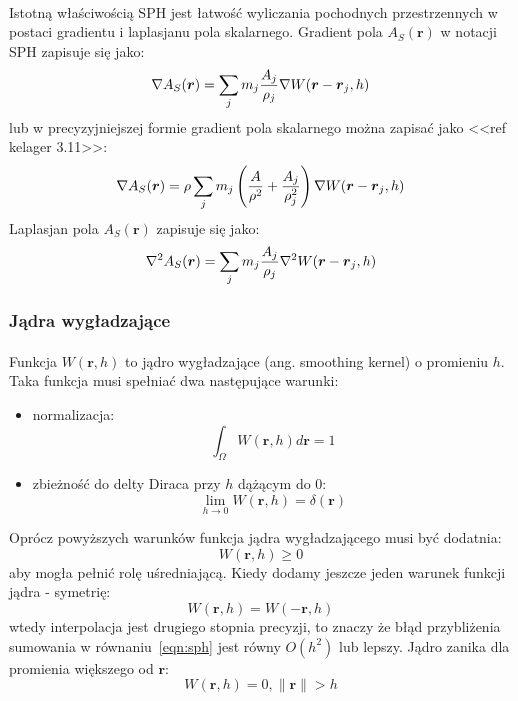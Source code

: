 \paragraph{}
Istotną właściwością SPH jest łatwość wyliczania pochodnych przestrzennych w postaci gradientu i laplasjanu pola skalarnego. Gradient pola $A_S(\boldsymbol{r})$ w notacji SPH zapisuje się jako:
\begin{equation}
\nabla A_S(\boldsymbol{r}) = \sum\limits_{j} m_j {A_j \over\rho_j} \nabla W(\boldsymbol{r}-\boldsymbol{r}_j, h)
\label{eqn:sph_grad}
\end{equation}
lub w precyzyjniejszej formie gradient pola skalarnego można zapisać jako <<ref kelager 3.11>>:
\begin{equation}
\nabla A_S(\boldsymbol{r}) = \rho \sum\limits_{j} m_j \left( {A \over \rho^2} + {A_j \over \rho_j^2} \right) \nabla W(\boldsymbol{r}-\boldsymbol{r}_j, h)
\label{eqn:sph_grad_prec}
\end{equation}
Laplasjan pola $A_S(\boldsymbol{r})$ zapisuje się jako:
\begin{equation}
\nabla^2 A_S(\boldsymbol{r}) = \sum\limits_{j} m_j {A_j \over\rho_j} \nabla^2 W(\boldsymbol{r}-\boldsymbol{r}_j, h)
\label{eqn:sph_lap}
\end{equation}
\par

\subsubsection{Jądra wygładzające}

\paragraph{}
Funkcja $W(\boldsymbol{r}, h)$ to jądro wygładzające (ang. smoothing kernel) o promieniu $h$. Taka funkcja musi spełniać dwa następujące warunki:
\begin{itemize}
\item normalizacja: $$\int_{\Omega} W(\boldsymbol{r}, h) d\boldsymbol{r} = 1$$
\item zbieżność do delty Diraca przy $h$ dążącym do 0: $$\lim_{h\to0} W(\boldsymbol{r}, h) = \delta(\boldsymbol{r})$$
\end{itemize}
\vspace{3ex}
\noindent
Oprócz powyższych warunków funkcja jądra wygładzającego musi być dodatnia: $$W(\boldsymbol{r}, h) \ge 0$$ aby mogła pełnić rolę uśredniającą. Kiedy dodamy jeszcze jeden warunek funkcji jądra - symetrię: $$W(\boldsymbol{r}, h) = W(\boldsymbol{-r}, h)$$ wtedy interpolacja jest drugiego stopnia precyzji, to znaczy że błąd przybliżenia sumowania w równaniu~\eqref{eqn:sph} jest równy $O(h^{2})$ lub lepszy. Jądro zanika dla promienia większego od $\boldsymbol{r}$: $$W(\boldsymbol{r}, h) = 0, \| \mathbf{r} \| > h$$
\par

